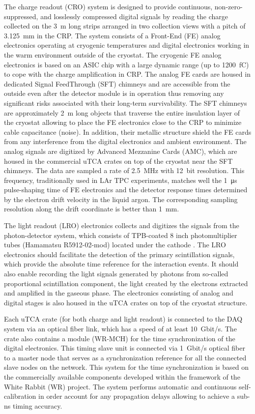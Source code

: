 The charge readout (CRO) system is designed to provide continuous, non-zero-suppressed, and losslessly compressed digital signals by reading the charge collected on the \SI{3}{m} long strips arranged in two collection views with a pitch of \SI{3.125}{mm} in the CRP. The system consists of a Front-End (FE) analog electronics operating at cryogenic temperatures and digital electronics working in the warm environment outside of the cryostat.  The cryogenic FE analog electronics is based on an ASIC chip with a large dynamic range (up to \SI{1200}{fC}) to cope with the charge amplification in CRP. The analog FE cards are housed in dedicated Signal FeedThrough (SFT) chimneys and are accessible from the outside even after the detector module is in operation thus removing any significant risks associated with their long-term survivability. The SFT chimneys are approximately \SI{2}{m} long objects that traverse the entire insulation layer of the cryostat allowing to place the FE electronics close to the CRP to minimize cable capacitance (noise).  In addition, their metallic structure shield the FE cards from any interference from the digital electronics and ambient environment. The analog signals are digitized by Advanced Mezzanine Cards (AMC), which are housed in the commercial uTCA crates on top of the cryostat near the SFT chimneys. The data are sampled a rate of \SI{2.5}{MHz} with \SI{12}{bit} resolution.  This frequency, traditionally used in LAr TPC experiments, matches well the \SI{1}{\micro\second} pulse-shaping time of FE electronics and the detector response times determined by the electron drift velocity in the liquid argon. The corresponding sampling resolution along the drift coordinate is better than \SI{1}{\mm}. 

The light readout (LRO) electronics collects and digitizes the signals from the photon-detector system, which consists of TPB-coated \num{8} inch photomultiplier tubes (Hamamatsu R5912-02-mod) located under the cathode . The LRO electronics should facilitate the detection of the primary scintillation signals, which provide the absolute time reference for the interaction events. It should also enable recording the light signals generated by photons from so-called proportional scintillation component, the light created by the electrons extracted and amplified in the gaseous phase. The electronics consisting of analog and digital stages is also housed in the uTCA crates on top of the cryostat structure.

Each uTCA crate (for both charge and light readout) is connected to the DAQ system via an optical fiber link, which has a speed of at least \SI{10}{Gbit/s}. The crate also contains a module (WR-MCH) for the time synchronization of the digital electronics. This timing slave unit is connected via \SI{1}{Gbit/s} optical fiber to a master node that serves as a synchronization reference for all the connected slave nodes on the network. This system for the time synchronization is based on the commercially available components developed within the framework of the White Rabbit (WR) project. The system performs automatic and continuous self-calibration in order account for any propagation delays allowing to achieve a sub-ns timing accuracy.


